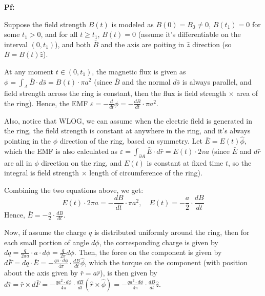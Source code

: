 \documentclass{article}
\begin{document}
\textbf{Pf:}

Suppose the field strength $B(t)$ is modeled as $B(0)=B_0\neq 0$, $B(t_1)=0$ for some $t_1>0$, and for all $t\geq t_1$, $B(t)=0$ (assume it's differentiable on the interval $(0,t_1)$),
and both $\bar{B}$ and the axis are poiting in $\hat{z}$ direction (so $\bar{B}=B(t)\hat{z}$).

At any moment $t\in (0,t_1)$, the magnetic flux is given as $\phi=\int_A\bar{B}\cdot d\bar{s}=B(t)\cdot \pi a^2$ 
(since $\bar{B}$ and the normal $d\bar{s}$ is always parallel, and field strength across the ring is constant, then the flux is field strength $\times$ area of the ring).
Hence, the EMF $\varepsilon = -\frac{d}{dt}\phi = -\frac{dB}{dt}\cdot \pi a^2$.

\hfill

Also, notice that WLOG, we can assume when the electric field is generated in the ring, the field strength is constant at anywhere in the ring, and it's always pointing in the $\phi$ direction of the ring, based on symmetry.
Let $\bar{E}=E(t)\hat{\phi}$, which the EMF is also calculated as $\varepsilon = \int_{\partial A}\bar{E}\cdot d\bar{r} = E(t)\cdot 2\pi a$ (since $\bar{E}$ and $d\bar{r}$ are all in $\phi$ direction on the ring, and $E(t)$ is constant
at fixed time $t$, so the integral is field strength $\times$ length of circumference of the ring).

Combining the two equations above, we get:
$$E(t)\cdot 2\pi a=-\frac{dB}{dt}\cdot \pi a^2,\quad E(t)=-\frac{a}{2}\cdot\frac{dB}{dt}$$
Hence, $\bar{E}=-\frac{a}{2}\cdot \frac{dB}{dt}$.

\hfill

Now, if assume the charge $q$ is distributed uniformly around the ring, then for each small portion of angle $d\phi$, the corresponding charge is given by $dq = \frac{q}{2\pi a}\cdot a\cdot d\phi = \frac{q}{2\pi} d\phi$.
Then, the force on the component is given by $d\bar{F}=dq\cdot \bar{E} = -\frac{qa\cdot d\phi}{4\pi}\cdot \frac{dB}{dt}\hat{\phi}$, which the torque on the component (with position about the axis given by $\bar{r}=a\hat{r}$),
is then given by $d\bar{\tau}=\bar{r}\times d\bar{F} = -\frac{qa^2\cdot d\phi}{4\pi}\cdot \frac{dB}{dt}(\hat{r}\times \hat{\phi}) = -\frac{qa^2\cdot d\phi}{4\pi}\cdot \frac{dB}{dt}\hat{z}$.
\end{document}
